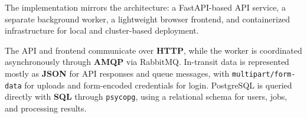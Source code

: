\documentclass{scrartcl}
\begin{document}

%   
%   
%   



The implementation mirrors the architecture: a FastAPI-based API service, a separate background worker, a lightweight browser frontend, and containerized infrastructure for local and cluster-based deployment.

The API and frontend communicate over \textbf{HTTP}, while the worker is coordinated asynchronously through \textbf{AMQP} via RabbitMQ. In-transit data is represented mostly as \textbf{JSON} for API responses and queue messages, with \texttt{multipart/form-data} for uploads and form-encoded credentials for login. PostgreSQL is queried directly with \textbf{SQL} through \texttt{psycopg}, using a relational schema for users, jobs, and processing results.
\end{document}
